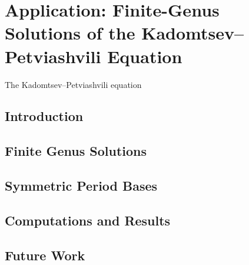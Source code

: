 \chapter{Application: Finite-Genus Solutions of the Kadomtsev--Petviashvili
  Equation}\label{ch:kp}

The Kadomtsev--Petviashvili equation

\section{Introduction}\label{sec:kp-introduction}



\section{Finite Genus Solutions}\label{sec:kp-finite-genus-solutions}

\section{Symmetric Period Bases}\label{sec:kp-symmetric-period-bases}

\section{Computations and Results}\label{sec:kp-computations-and-results}

\section{Future Work}\label{sec:kp-future-work}
